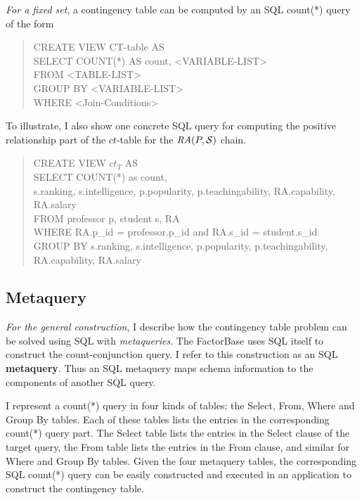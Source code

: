 \documentclass{sfuthesis}
\newcommand{\ct}{\mathit{ct}}
\begin{document}
{\em For a fixed set}, a  contingency table can be computed by an SQL count(*) query of the form 
\begin{quote}
CREATE VIEW CT-table  AS\\
SELECT COUNT(*) AS count, <VARIABLE-LIST>\\
FROM <TABLE-LIST>\\
GROUP BY <VARIABLE-LIST>\\
WHERE <Join-Conditions>
\end{quote}
To illustrate, I  also show one concrete SQL query for computing the positive relationship part of the $\ct$-table for the $\mathit{RA}(P,\mathcal{S})$ chain.
\begin{quote}
CREATE VIEW $\ct_{T}$  AS 
\\SELECT COUNT(*) as  count,  \\ s.ranking, s.intelligence, p.popularity, p.teachingability, RA.capability, RA.salary  \\
FROM professor p, student s, RA  \\
WHERE  RA.p\_id = professor.p\_id and RA.s\_id = student.s\_id  \\
GROUP BY s.ranking,  s.intelligence, p.popularity,  p.teachingability, \\RA.capability,  RA.salary
\end{quote}
\subsection{Metaquery} \label {sub:meta}
{\em For the general construction}, I  describe how the contingency table problem can be solved using SQL with {\em metaqueries}. 
The FactorBase  uses SQL itself to construct the count-conjunction query. I  refer to this construction as an SQL \textbf{metaquery}. Thus an SQL metaquery maps schema information to the components of another SQL query. 

I  represent a count(*) query in four kinds of tables: the Select, From, Where and Group By tables. Each of these tables lists the entries in the corresponding count(*) query part.
The Select table lists the entries in the Select clause of the target query, the From table lists the entries in the From clause, and similar for Where and Group By tables. 
Given the four metaquery tables, the corresponding SQL count(*) query can be easily constructed and executed in an application to construct the contingency table.
\end{document}

